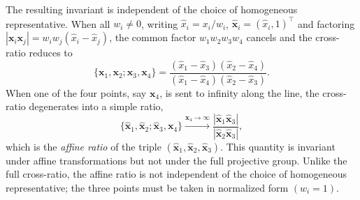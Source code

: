 \documentclass{birkjour}
\theoremstyle{definition}
\theoremstyle{remark}
\begin{document}
The resulting invariant is independent of the choice of homogeneous representative. When all $w_i \neq 0$, writing $\hat{x}_i = x_i / w_i$, $\hat{\mathbf{x}}_i = (\hat{x}_i, 1)^\top$ and factoring $|\mathbf{x}_i \mathbf{x}_j| = w_i w_j (\hat{x}_i - \hat{x}_j)$, the common factor $w_1 w_2 w_3 w_4$ cancels and the cross-ratio reduces to
\begin{equation}
\label{eq:classical-cr}
  \{\mathbf{x}_1, \mathbf{x}_2; \mathbf{x}_3, \mathbf{x}_4\}
  = \frac{(\hat{x}_1 - \hat{x}_3)(\hat{x}_2 - \hat{x}_4)}
         {(\hat{x}_1 - \hat{x}_4)(\hat{x}_2 - \hat{x}_3)}.
\end{equation}
When one of the four points, say $\mathbf{x}_4$, is sent to infinity
along the line, the cross-ratio degenerates into a simple ratio,
\begin{equation}
  \{\hat{\mathbf{x}}_1, \hat{\mathbf{x}}_2; \hat{\mathbf{x}}_3, \mathbf{x}_4\}
  \xrightarrow{\mathbf{x}_4 \to \infty}
  \frac{|\hat{\mathbf{x}}_1\hat{\mathbf{x}}_3|}{|\hat{\mathbf{x}}_2\hat{\mathbf{x}}_3|},
\end{equation}
which is the \emph{affine ratio} of the triple
$(\hat{\mathbf{x}}_1, \hat{\mathbf{x}}_2, \hat{\mathbf{x}}_3)$. This quantity is invariant under
affine transformations but not under the full projective group.
Unlike the full cross-ratio, the affine ratio is not independent of the choice of homogeneous representative; the three points must be taken in normalized form $(w_i=1)$.
\end{document}

